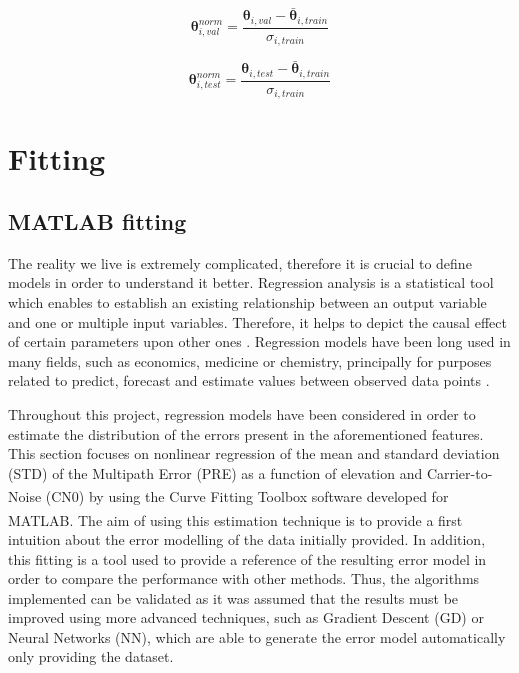 \documentclass[a4paper, report, oneside, UKenglish]{memoir}
\newcommand{\btheta}{\boldsymbol{\theta}}
\begin{document}
\begin{equation}
    \btheta_{i, val}^{norm} = \frac{\btheta_{i, val} - \bar{\btheta}_{i, train}}{\sigma_{i, train}}
\end{equation}

\begin{equation}
    \btheta_{i, test}^{norm} = \frac{\btheta_{i, test} - \bar{\btheta}_{i, train}}{\sigma_{i, train}}
\end{equation}



\chapter{Fitting}\label{ch:fitting}

\section{MATLAB fitting}\label{matlabfit}

The reality we live is extremely complicated, therefore it is crucial to define models in order to understand it better. Regression analysis is a statistical tool which enables to establish an existing relationship between an output variable and one or multiple input variables. Therefore, it helps to depict the causal effect of certain parameters upon other ones \cite{IntroToRegresAna}. Regression models have been long used in many fields, such as economics, medicine or chemistry, principally for purposes related to predict, forecast and estimate values between observed data points \cite{MathWorksRegression}.  

Throughout this project, regression models have been considered in order to estimate the distribution of the errors present in the aforementioned features. This section focuses on nonlinear regression of the mean and standard deviation (STD) of the Multipath Error (PRE) as a function of elevation and Carrier-to-Noise (CN0) by using the Curve Fitting Toolbox\textsuperscript{\tiny\texttrademark} software developed for MATLAB\textsuperscript{\tiny\textregistered}. The aim of using this estimation technique is to provide a first intuition about the error modelling of the data initially provided. In addition, this fitting is a tool used to provide a reference of the resulting error model in order to compare the performance with other methods. Thus, the algorithms implemented can be validated as it was assumed that the results must be improved using more advanced techniques, such as Gradient Descent (GD) or Neural Networks (NN), which are able to generate the error model automatically only providing the dataset. 
\end{document}
